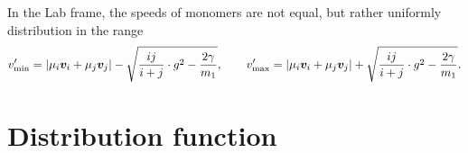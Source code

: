 \documentclass[aps,prl,preprint,groupedaddress,10pt]{revtex4-2}
\begin{document}
In the Lab frame, the speeds of monomers are not equal, but rather uniformly 
distribution in the range 
\begin{equation}
    v'_{\mathrm{min}}=\abs{\mu_i\vb*{v}_i+\mu_j\vb*{v}_j}-
    \sqrt{\frac{ij}{i+j}\cdot g^2-\frac{2\gamma}{m_1}},\qquad
    v'_{\mathrm{max}}=\abs{\mu_i\vb*{v}_i+\mu_j\vb*{v}_j}+
    \sqrt{\frac{ij}{i+j}\cdot g^2-\frac{2\gamma}{m_1}}.
\end{equation}

\section{Distribution function}




    
\end{document}
